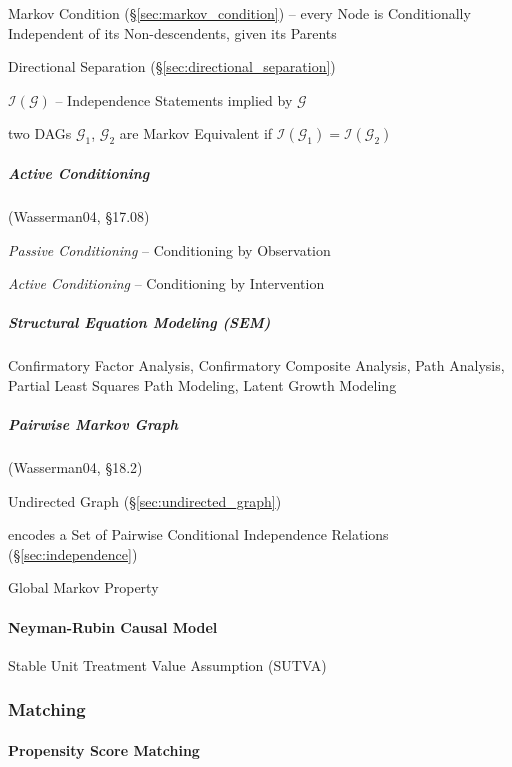 Markov Condition (\S\ref{sec:markov_condition}) -- every Node is Conditionally
Independent of its Non-descendents, given its Parents

Directional Separation (\S\ref{sec:directional_separation})

$\mathcal{I}(\mathcal{G})$ -- Independence Statements implied by $\mathcal{G}$

two DAGs $\mathcal{G}_1$, $\mathcal{G}_2$ are Markov Equivalent if
$\mathcal{I}(\mathcal{G}_1) = \mathcal{I}(\mathcal{G}_2)$



\subparagraph{Active Conditioning}\label{sec:active_conditioning}\hfill

(Wasserman04, \S17.08)

\emph{Passive Conditioning} -- Conditioning by Observation

\emph{Active Conditioning} -- Conditioning by Intervention



\subparagraph{Structural Equation Modeling (SEM)}\label{sec:sem}\hfill


Confirmatory Factor Analysis, Confirmatory Composite Analysis, Path Analysis,
Partial Least Squares Path Modeling, Latent Growth Modeling



\subparagraph{Pairwise Markov Graph}\label{sec:pairwise_markov}\hfill

(Wasserman04, \S18.2)

Undirected Graph (\S\ref{sec:undirected_graph})

encodes a Set of Pairwise Conditional Independence Relations
(\S\ref{sec:independence})

Global Markov Property



\paragraph{Neyman-Rubin Causal Model}\label{sec:neyman_rubin}\hfill

Stable Unit Treatment Value Assumption (SUTVA)



\subsubsection{Matching}\label{sec:statistical_matching}

\paragraph{Propensity Score Matching}\label{sec:propensity_score_matching}\hfill



